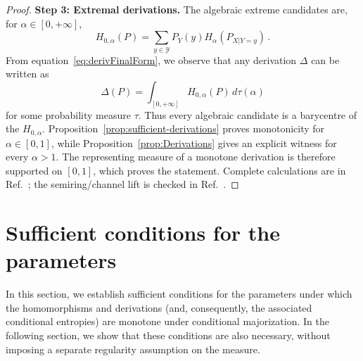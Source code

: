 \documentclass[aps,pra,11pt,onecolumn,nofootinbib,tightenlines]{revtex4-2}
\theoremstyle{definition}
\newcommand{\mc}[1]{\mathcal{#1}}
\begin{document}
\begin{proof}
\medskip
\noindent \noindent\textbf{Step 3: Extremal derivations.}
The algebraic extreme candidates are, for $\alpha\in[0,+\infty]$,
\begin{equation}\label{eq:ExtDerivation proof}
H_{0,\alpha}(P)=\sum_{y\in\mc Y} P_Y(y)H_\alpha(P_{X|Y=y})\,.
\end{equation}
From equation~\eqref{eq:derivFinalForm}, we observe that any derivation \(\Delta\) can be written as
\begin{equation}
    \Delta(P) = \int_{[0,+\infty]} H_{0,\alpha}(P)\, d\tau(\alpha)
\end{equation}
for some probability measure \(\tau\). Thus every algebraic candidate is a
barycentre of the $H_{0,\alpha}$. Proposition~\ref{prop:sufficient-derivations}
proves monotonicity for $\alpha\in[0,1]$, while
Proposition~\ref{prop:Derivations} gives an explicit witness for
every $\alpha>1$. The representing measure of a monotone derivation is
therefore supported on $[0,1]$, which proves the statement. Complete
calculations are in Ref.~\cite{rubboli2026parametersFull}; the semiring/channel
lift is checked in Ref.~\cite{rubboli2026parametersLean}.
\end{proof}


\newcommand{\ParameterMainForms}{the candidate families derived above}
\newcommand{\ParameterMainTemperateForm}{the temperate representation derived above}
\newcommand{\ParameterMainLift}{the convexity-to-monotonicity and semiring-lift results proved in the appendix}
\newcommand{\ParameterMainDerivationLift}{the corresponding derivation results proved in the appendix}
\newcommand{\ParameterMainDerivationRepresentation}{the representation of derivations obtained above}
\newcommand{\ParameterMainSemiring}{the conditional-majorization semiring defined above}
\newcommand{\ParameterMainNormalization}{the normalization fixed above}
\newcommand{\ParameterMainDerivationDefinition}{defined above}
\newcommand{\ParameterMainFinalFamilies}{the temperate, tropical, and derivation candidate families introduced above}
\newcommand{\ParameterSpanOrigin}{is the representation result established above}

\section{Sufficient conditions for the parameters}
\label{sec:sufficient-conditions-measure}

In this section, we establish sufficient conditions for the parameters under which the
homomorphisms and derivations (and, consequently, the associated conditional entropies)
are monotone under conditional majorization.  In the following section, we show that
these conditions are also necessary, without imposing a separate regularity assumption
on the measure.
\end{document}
